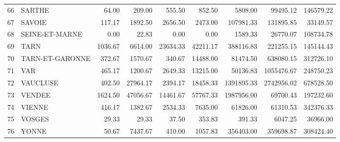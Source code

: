 \documentclass[11pt, a4paper]{article}
\begin{document}
\begin{center}
\begin{table}[ht]
\begin{tabular}{rlrrrrrrr}
  66 & SARTHE & 64.00 & 209.00 & 555.50 & 852.50 & 5808.00 & 99495.12 & 146579.22 
\\ 
  67 & SAVOIE & 117.17 & 1892.50 & 2656.50 & 2473.00 & 107981.33 & 131895.85 & 33149.57 \\ 
  68 & SEINE-ET-MARNE & 0.00 & 22.83 & 0.00 & 0.00 & 1589.33 & 26770.07 & 108734.78 \\
  69 & TARN & 1036.67 & 6614.00 & 23634.33 & 42211.17 & 388116.83 & 221255.15 & 145144.43 \\ 
  70 & TARN-ET-GARONNE & 372.67 & 1570.67 & 340.67 & 14488.00 & 81474.50 & 638080.15 & 312726.10 \\ 
  71 & VAR & 465.17 & 1200.67 & 2649.33 & 13215.00 & 50136.83 & 1055476.67 & 248750.23 \\ 
  72 & VAUCLUSE & 402.50 & 27964.17 & 2394.17 & 18458.33 & 1391895.33 & 2742956.02 & 678528.50 \\ 
  73 & VENDEE & 1624.50 & 47056.67 & 14461.67 & 57767.33 & 1987956.00 & 69700.43 & 197232.60 \\ 
  74 & VIENNE & 416.17 & 1382.67 & 2534.33 & 7635.00 & 61826.00 & 61310.53 & 342376.33 \\ 
  75 & VOSGES & 29.33 & 29.33 & 37.50 & 353.83 & 391.33 & 6047.25 & 36966.00 \\ 
  76 & YONNE & 50.67 & 7437.67 & 410.00 & 1057.83 & 356403.00 & 359698.87 & 308424.40 \\
   \hline
\end{tabular}
\end{table}
\end{center}
\end{document}
